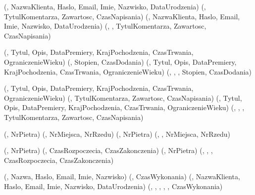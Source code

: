 \zwiazek
\encje
    \encja[KLIENT](, NazwaKlienta, Haslo, Email, Imie, Nazwisko, DataUrodzenia)
    \encja[KOMENTARZ](, TytulKomentarza, Zawartosc, CzasNapisania)
\relacje
    (, NazwaKlienta, Haslo, Email, Imie, Nazwisko, DataUrodzenia)
    (, , TytulKomentarza, Zawartosc, CzasNapisania)

\zwiazek
\encje
    \encja[FILM](, Tytul, Opis, DataPremiery, KrajPochodzenia, CzasTrwania, OgraniczenieWieku)
    \encja[OCENA](, Stopien, CzasDodania)
\relacje
    (, Tytul, Opis, DataPremiery, KrajPochodzenia, CzasTrwania, OgraniczenieWieku)
    (, , , Stopien, CzasDodania)

\zwiazek
\encje
    \encja[FILM](, Tytul, Opis, DataPremiery, KrajPochodzenia, CzasTrwania, OgraniczenieWieku)
    \encja[KOMENTARZ](, TytulKomentarza, Zawartosc, CzasNapisania)
\relacje
    (, Tytul, Opis, DataPremiery, KrajPochodzenia, CzasTrwania, OgraniczenieWieku)
    (, , , TytulKomentarza, Zawartosc, CzasNapisania)

\zwiazek
\encje
    \encja[SALA](, NrPietra)
    \encja[MIEJSCE](, NrMiejsca, NrRzedu)
\relacje
    (, NrPietra)
    (, , NrMiejsca, NrRzedu)

\zwiazek
\encje
    \encja[SALA](, NrPietra)
    \encja[SPEKTAKL](, CzasRozpoczecia, CzasZakonczenia)
\relacje
    (, NrPietra)
    (, , , CzasRozpoczecia, CzasZakonczenia)
	
\zwiazek
\encje
	\encja[KASJER](, Nazwa, Haslo, Email, Imie, Nazwisko)
    \encja[REZERWACJA](, CzasWykonania)
\relacje
    (, NazwaKlienta, Haslo, Email, Imie, Nazwisko, DataUrodzenia)
    (, , , , , CzasWykonania)
